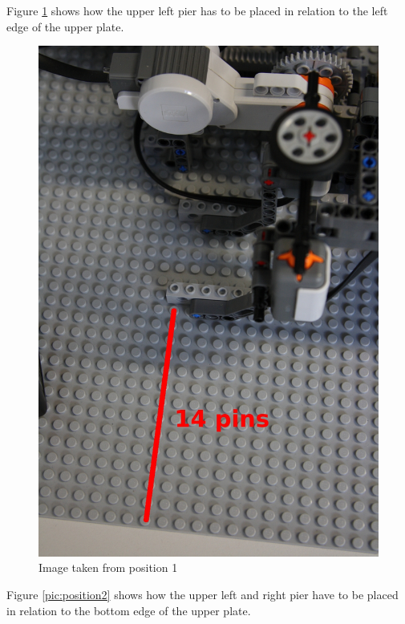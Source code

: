 \documentclass[%
  a4paper,%
  11pt,%
  blue,%
  hyperref	%
  ]{tubsartcl}
\begin{document}
\clearpage

Figure \ref{pic:position1} shows how the upper left pier has to be placed in relation to the left edge of the upper plate.

\begin{figure}[!htb]
\begin{center}
\includegraphics[scale=0.35]{graphics_lego/position1.jpg}
\end{center}
\caption{Image taken from position 1}
\label{pic:position1}
\end{figure}

\clearpage

Figure \ref{pic:position2} shows how the upper left and right pier have to be placed in relation to the bottom edge of the upper plate.
\end{document}
